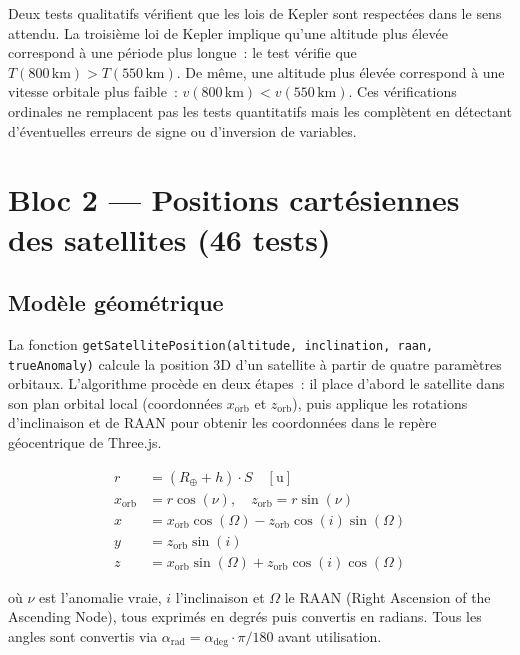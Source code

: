 \documentclass[12pt,a4paper]{article}
\begin{document}
Deux tests qualitatifs vérifient que les lois de Kepler sont respectées dans le sens attendu. La troisième loi de Kepler implique qu'une altitude plus élevée correspond à une période plus longue~: le test vérifie que $T(800\,\text{km}) > T(550\,\text{km})$. De même, une altitude plus élevée correspond à une vitesse orbitale plus faible~: $v(800\,\text{km}) < v(550\,\text{km})$. Ces vérifications ordinales ne remplacent pas les tests quantitatifs mais les complètent en détectant d'éventuelles erreurs de signe ou d'inversion de variables.

\section{Bloc 2 — Positions cartésiennes des satellites (46 tests)}

\subsection{Modèle géométrique}

La fonction \texttt{getSatellitePosition(altitude, inclination, raan, trueAnomaly)} calcule la position 3D d'un satellite à partir de quatre paramètres orbitaux. L'algorithme procède en deux étapes~: il place d'abord le satellite dans son plan orbital local (coordonnées $x_\text{orb}$ et $z_\text{orb}$), puis applique les rotations d'inclinaison et de RAAN pour obtenir les coordonnées dans le repère géocentrique de Three.js.

\begin{align}
    r &= (R_\oplus + h) \cdot S \quad [\text{u}] \\
    x_\text{orb} &= r \cos(\nu), \quad z_\text{orb} = r \sin(\nu) \\
    x &= x_\text{orb}\cos(\Omega) - z_\text{orb}\cos(i)\sin(\Omega) \\
    y &= z_\text{orb}\sin(i) \\
    z &= x_\text{orb}\sin(\Omega) + z_\text{orb}\cos(i)\cos(\Omega)
\end{align}

où $\nu$ est l'anomalie vraie, $i$ l'inclinaison et $\Omega$ le RAAN (Right Ascension of the Ascending Node), tous exprimés en degrés puis convertis en radians. Tous les angles sont convertis via $\alpha_\text{rad} = \alpha_\text{deg} \cdot \pi/180$ avant utilisation.
\end{document}
